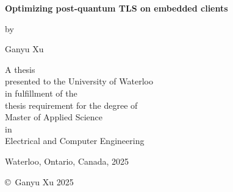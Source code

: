 \documentclass[letterpaper,12pt,titlepage,oneside,final]{book}
\begin{document}
\pagestyle{empty}

\begin{titlepage}
        \begin{center}
        \vspace*{1.0cm}

        \Huge
        {\bf Optimizing post-quantum TLS on embedded clients
        }

        \vspace*{1.0cm}

        \normalsize
        by \\

        \vspace*{1.0cm}

        \Large
        Ganyu Xu \\

        \vspace*{3.0cm}

        \normalsize
        A thesis \\
        presented to the University of Waterloo \\ 
        in fulfillment of the \\
        thesis requirement for the degree of \\
        Master of Applied Science \\
        in \\
        Electrical and Computer Engineering \\

        \vspace*{2.0cm}

        Waterloo, Ontario, Canada, 2025 \\

        \vspace*{1.0cm}

        \copyright\ Ganyu Xu 2025 \\
        \end{center}
\end{titlepage}
\end{document}
